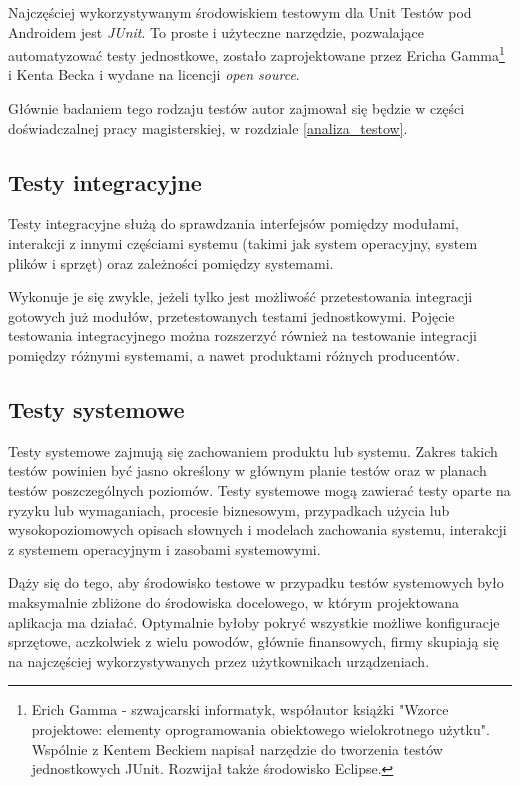 Najczęściej wykorzystywanym środowiskiem testowym dla Unit Testów pod Androidem jest \textit{JUnit}. To proste i użyteczne narzędzie, pozwalające automatyzować testy jednostkowe, zostało zaprojektowane przez Ericha Gamma\footnote{Erich Gamma - szwajcarski informatyk, współautor książki "Wzorce projektowe: elementy oprogramowania obiektowego wielokrotnego użytku". Wspólnie z Kentem Beckiem napisał narzędzie do tworzenia testów jednostkowych JUnit. Rozwijał także środowisko Eclipse.} i Kenta Becka i wydane na licencji \textit{open source}\cite{website:opensource}.

Głównie badaniem tego rodzaju testów autor zajmował się będzie w części doświadczalnej pracy magisterskiej, w rozdziale \ref{analiza_testow}.

\subsection{Testy integracyjne}

Testy integracyjne służą do sprawdzania interfejsów pomiędzy modułami, interakcji z innymi częściami systemu (takimi jak system operacyjny, system plików i sprzęt) oraz zależności pomiędzy systemami.

Wykonuje je się zwykle, jeżeli tylko jest możliwość przetestowania integracji gotowych już modułów, przetestowanych testami jednostkowymi. Pojęcie testowania integracyjnego można rozszerzyć również na testowanie integracji pomiędzy różnymi systemami, a nawet produktami różnych producentów.\cite{bib:sylabus:foundation}

\subsection{Testy systemowe}

Testy systemowe zajmują się zachowaniem produktu lub systemu. Zakres takich testów powinien być jasno określony w głównym planie testów oraz w planach testów poszczególnych poziomów. Testy systemowe mogą zawierać testy oparte na ryzyku lub wymaganiach, procesie biznesowym, przypadkach użycia lub wysokopoziomowych opisach słownych i modelach zachowania systemu, interakcji z systemem operacyjnym i zasobami systemowymi.

Dąży się do tego, aby środowisko testowe w przypadku testów systemowych było maksymalnie zbliżone do środowiska docelowego, w którym projektowana aplikacja ma działać. Optymalnie byłoby pokryć wszystkie możliwe konfiguracje sprzętowe, aczkolwiek z wielu powodów, głównie finansowych, firmy skupiają się na najczęściej wykorzystywanych przez użytkownikach urządzeniach.\cite{bib:sylabus:foundation} 

